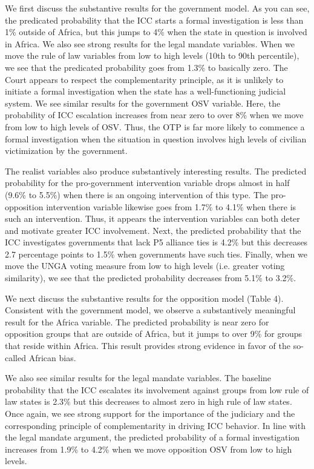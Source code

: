 We first discuss the substantive results for the government model. As you can see, the predicated probability that the ICC starts a formal investigation is less than 1\% outside of Africa, but this jumps to 4\% when the state in question is involved in Africa. We also see strong results for the legal mandate variables. When we move the rule of law variables from low to high levels (10th to 90th percentile), we see that the predicated probability goes from 1.3\% to basically zero. The Court appears to respect the complementarity principle, as it is unlikely to initiate a formal investigation when the state has a well-functioning judicial system. We see similar results for the government OSV variable. Here, the probability of ICC escalation increases from near zero to over 8\% when we move from low to high levels of OSV. Thus, the OTP is far more likely to commence a formal investigation when the situation in question involves high levels of civilian victimization by the government.   

The realist variables also produce substantively interesting results. The predicted probability for the pro-government intervention variable drops almost in half (9.6\% to 5.5\%) when there is an ongoing intervention of this type. The pro-opposition intervention variable likewise goes from 1.7\% to 4.1\% when there is such an intervention.  Thus, it appears the intervention variables can both deter and motivate greater ICC involvement. Next, the predicted probability that the ICC investigates governments that lack P5 alliance ties is 4.2\% but this decreases 2.7 percentage points to 1.5\% when governments have such ties. Finally, when we move the UNGA voting measure from low to high levels (i.e. greater voting similarity), we see that the predicted probability decreases from 5.1\% to 3.2\%. 

We next discuss the substantive results for the opposition model (Table 4).  Consistent with the government model, we observe a substantively meaningful result for the Africa variable.  The predicted probability is near zero for opposition groups that are outside of Africa, but it jumps to over 9\% for groups that reside within Africa. This result provides strong evidence in favor of the so-called African bias.  

We also see similar results for the legal mandate variables.   The baseline probability that the ICC escalates its involvement against groups from low rule of law states is 2.3\% but this decreases to almost zero in high rule of law states. Once again, we see strong support for the importance of the judiciary and the corresponding principle of complementarity in driving ICC behavior.  In line with the legal mandate argument, the predicted probability of a formal investigation increases from 1.9\% to 4.2\% when we move opposition OSV from low to high levels. 

